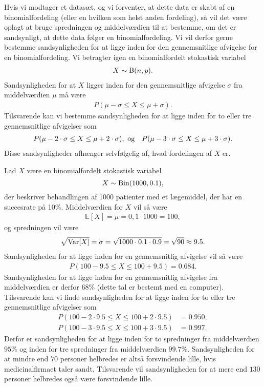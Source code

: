 Hvis vi modtager et datasæt, og vi forventer, at dette data er skabt af en binomialfordeling (eller en hvilken som helst anden fordeling), så vil det være oplagt at bruge spredningen og middelværdien til at bestemme, om det er sandsynligt, at dette data følger en binomialfordeling. Vi vil derfor gerne bestemme sandsynligheden for at ligge inden for den gennemsnitlige afvigelse for en binomialfordeling. Vi betragter igen en binomialfordelt stokastisk variabel 
\begin{align*}
X \sim \textnormal{B}(n,p).
\end{align*}
Sandsynligheden for at $X$ ligger inden for den gennemsnitlige afvigelse $\sigma$ fra middelværdien $\mu$ må være
\begin{align*}
P(\mu - \sigma \leq X \leq \mu + \sigma).
\end{align*}
Tilsvarende kan vi bestemme sandsynligheden for at ligge inden for to eller tre gennemsnitlige afvigelser som
\begin{align*}
&P(\mu - 2\cdot \sigma \leq X \leq \mu + 2\cdot \sigma), \textnormal{ og}
&P(\mu - 3\cdot \sigma \leq X \leq \mu + 3\cdot \sigma).
\end{align*}
Disse sandsynligheder afhænger selvfølgelig af, hvad fordelingen af $X$ er. 
\begin{exa}
Lad $X$ være en binomialfordelt stokastisk variabel
\[
X \sim \textnormal{Bin}(1000,0.1),
\]
der beskriver behandlingen af 1000 patienter med et lægemiddel, der har en succesrate på 10$\%$. Middelværdien for $X$ vil så være
\begin{align*}
\mathbb{E}[X] = \mu = 0,1\cdot 1000 = 100,
\end{align*}
og spredningen vil være
\begin{align*}
\sqrt{\textnormal{Var}[X]} = \sigma = \sqrt{1000\cdot 0.1 \cdot 0.9} = \sqrt{90} \approx 9.5.
\end{align*}
Sandsynligheden for at ligge inden for en gennemsnitlig afvigelse vil så være
\begin{align*}
P(100-9.5 \leq X \leq 100+9.5) = 0.684.
\end{align*}
Sandsynligheden for at ligge inden for en gennemsnitlig afvigelse fra middelværdien er derfor $68\%$ (dette tal er bestemt med en computer). Tilsvarende kan vi finde sandsynligheden for at ligge inden for to eller tre gennemsnitlige afvigelser som
\begin{align*}
P(100-2\cdot 9.5 \leq X \leq 100+2\cdot 9.5 ) &= 0.950,\\
P(100-3\cdot 9.5 \leq X \leq 100+3\cdot 9.5) &= 0.997.
\end{align*}
Derfor er sandsynligheden for at ligge inden for to spredninger fra middelværdien $95\%$ og inden for tre spredninger fra middelværdien $99.7\%$. Sandsynligheden for at mindre end $70$ personer helbredes er altså forsvindende lille, hvis medicinalfirmaet taler sandt. Tilsvarende vil sandsynligheden for at mere end $130$ personer helbredes også være forsvindende lille. 
\end{exa}






